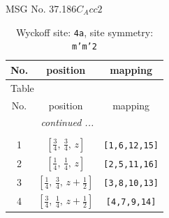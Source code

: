 \documentclass[fleqn,8pt]{jsarticle}
\begin{document}
\setcounter{MaxMatrixCols}{32}

\renewcommand{\tablename}{Table~}
\renewcommand{\figurename}{Figure~}
\begin{center}
\LARGE
MSG No. 37.186\quad$C_{A}cc2$
\end{center}
\renewcommand{\arraystretch}{1.2}
\begin{longtable}{ccc}
\caption{Wyckoff site: {\tt 4a}, site symmetry: {\tt m'm'2}}
 \\
 \hline \hline
No. & position & mapping \\ \hline \endfirsthead

\multicolumn{2}{l}{\tablename\ \thetable{}} \\
 \hline \hline
No. & position & mapping \\ \hline \endhead

 \hline \hline
\multicolumn{2}{r}{\footnotesize\it continued ...} \\ \endfoot

 \hline \hline
\multicolumn{2}{r}{} \\ \endlastfoot

1 & $\left[ \frac{3}{4},\, \frac{3}{4},\, z \right]$ & {\tt [1,6,12,15]} \\ \hline
2 & $\left[ \frac{1}{4},\, \frac{1}{4},\, z \right]$ & {\tt [2,5,11,16]} \\ \hline
3 & $\left[ \frac{1}{4},\, \frac{3}{4},\, z + \frac{1}{2} \right]$ & {\tt [3,8,10,13]} \\ \hline
4 & $\left[ \frac{3}{4},\, \frac{1}{4},\, z + \frac{1}{2} \right]$ & {\tt [4,7,9,14]} \\
\end{longtable}
\renewcommand{\arraystretch}{1.2}
\end{document}
